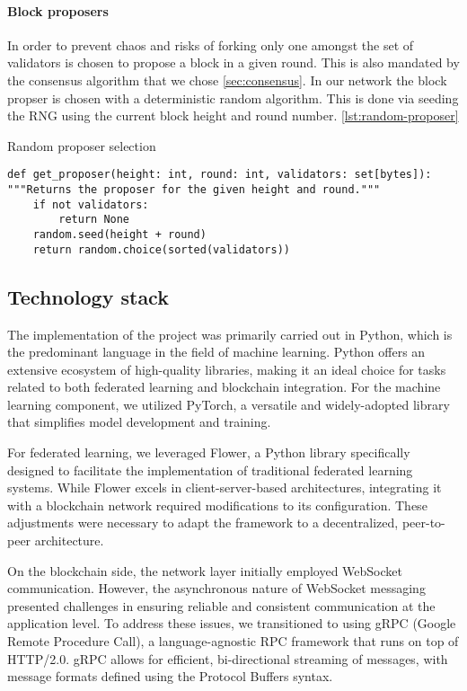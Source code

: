 \paragraph{Block proposers}
In order to prevent chaos and risks of forking only one amongst the set of validators is chosen to propose a
block in a given round.
This is also mandated by the consensus algorithm that we chose \ref{sec:consensus}.
In our network the block propser is chosen with a deterministic random algorithm.
This is done via seeding the RNG using the current block height and round number. \ref{lst:random-proposer}
\begin{listing}\caption{Random proposer selection}\label{lst:random-proposer}
  \begin{verbatim}
def get_proposer(height: int, round: int, validators: set[bytes]):
"""Returns the proposer for the given height and round."""
    if not validators:
        return None
    random.seed(height + round)
    return random.choice(sorted(validators))

  \end{verbatim}
\end{listing}

\subsection{Technology stack}
The implementation of the project was primarily carried out in Python, which is the predominant language in
the field of machine learning. Python offers an extensive ecosystem of high-quality libraries, making it an
ideal choice for tasks related to both federated learning and blockchain integration. For the machine
learning component, we utilized PyTorch, a versatile and widely-adopted library that simplifies model
development and training.

For federated learning, we leveraged Flower, a Python library specifically designed to facilitate the
implementation of traditional federated learning systems. While Flower excels in client-server-based
architectures, integrating it with a blockchain network required modifications to its configuration. These
adjustments were necessary to adapt the framework to a decentralized, peer-to-peer architecture.

On the blockchain side, the network layer initially employed WebSocket communication. However, the
asynchronous nature of WebSocket messaging presented challenges in ensuring reliable and consistent
communication at the application level. To address these issues, we transitioned to using gRPC (Google Remote
Procedure Call), a language-agnostic RPC framework that runs on top of HTTP/2.0. gRPC allows for efficient,
bi-directional streaming of messages, with message formats defined using the Protocol Buffers syntax.

